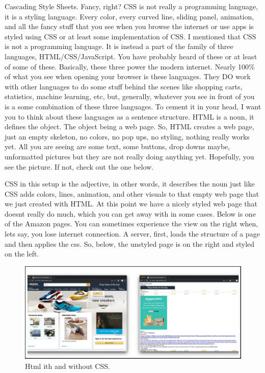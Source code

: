 \documentclass[]{book}
\begin{document}
Cascading Style Sheets. Fancy, right? CSS is not really a programming language, it is a styling language. Every color, every curved line, sliding panel, animation, and all the fancy stuff that you see when you browse the internet or use apps is styled using CSS or at least some implementation of CSS. I mentioned that CSS is not a programming language. It is instead a part of the family of three languages, HTML/CSS/JavaScript. You have probably heard of these or at least of some of these. Basically, these three power the modern internet. Nearly 100\% of what you see when opening your browser is these languages. They DO work with other languages to do some stuff behind the scenes like shopping carts, statistics, machine learning, etc, but, generally, whatever you see in front of you is a some combination of these three languages. To cement it in your head, I want you to think about these languages as a sentence structure. HTML is a noun, it defines the object. The object being a web page. So, HTML creates a web page, just an empty skeleton, no colors, no pop ups, no styling, nothing really works yet. All you are seeing are some text, some buttons, drop downs maybe, unformatted pictures but they are not really doing anything yet. Hopefully, you see the picture. If not, check out the one below.

CSS in this setup is the adjective, in other words, it describes the noun just like CSS adds colors, lines, animation, and other visuals to that empty web page that we just created with HTML. At this point we have a nicely styled web page that doesnt really do much, which you can get away with in some cases. Below is one of the Amazon pages. You can sometimes experience the view on the right when, lets say, you lose internet connection. A server, first, loads the structure of a page and then applies the css. So, below, the unstyled page is on the right and styled on the left.

\begin{figure}
\centering
\includegraphics{csshtml.png}
\caption{Html ith and without CSS.}
\end{figure}
\end{document}
